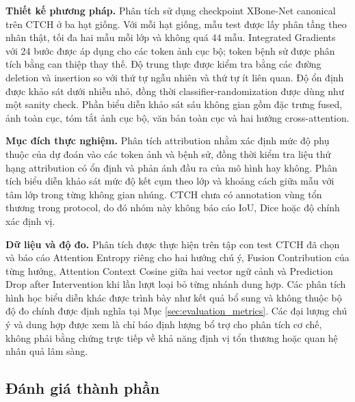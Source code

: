 \textbf{Thiết kế phương pháp.} Phân tích sử dụng checkpoint XBone-Net canonical
trên CTCH ở ba hạt giống. Với mỗi hạt giống, mẫu test được lấy phân tầng theo nhãn thật,
tối đa hai mẫu mỗi lớp và không quá 44 mẫu. Integrated Gradients với 24 bước
được áp dụng cho các token ảnh cục bộ; token bệnh sử được phân tích bằng can
thiệp thay thế. Độ trung thực được kiểm tra bằng các đường deletion và insertion
so với thứ tự ngẫu nhiên và thứ tự ít liên quan. Độ ổn định được khảo sát dưới
nhiễu nhỏ, đồng thời classifier-randomization được dùng như một sanity check.
Phần biểu diễn khảo sát sáu không gian gồm đặc trưng fused, ảnh toàn cục, tóm tắt
ảnh cục bộ, văn bản toàn cục và hai hướng cross-attention.

\textbf{Mục đích thực nghiệm.} Phân tích attribution nhằm xác định mức độ phụ
thuộc của dự đoán vào các token ảnh và bệnh sử, đồng thời kiểm tra liệu thứ hạng
attribution có ổn định và phản ánh đầu ra của mô hình hay không. Phân tích biểu
diễn khảo sát mức độ kết cụm theo lớp và khoảng cách giữa mẫu với tâm lớp trong
từng không gian nhúng. CTCH chưa có annotation vùng tổn thương trong protocol,
do đó nhóm này không báo cáo IoU, Dice hoặc độ chính xác định vị.

\textbf{Dữ liệu và độ đo.} Phân tích được thực hiện trên tập con test CTCH đã
chọn và báo cáo Attention Entropy riêng cho hai hướng chú ý, Fusion Contribution
của từng hướng, Attention Context Cosine giữa hai vector ngữ cảnh và Prediction
Drop after Intervention khi lần lượt loại bỏ từng nhánh dung hợp. Các phân tích
hình học biểu diễn khác được trình bày như kết quả bổ sung và không thuộc bộ độ
đo chính được định nghĩa tại Mục \ref{sec:evaluation_metrics}. Các đại lượng chú
ý và dung hợp được xem là chỉ báo định lượng bổ trợ cho phân tích cơ chế, không
phải bằng chứng trực tiếp về khả năng định vị tổn thương hoặc quan hệ nhân quả
lâm sàng.

\subsection{Đánh giá thành phần}
\label{subsec:component_evaluation}

